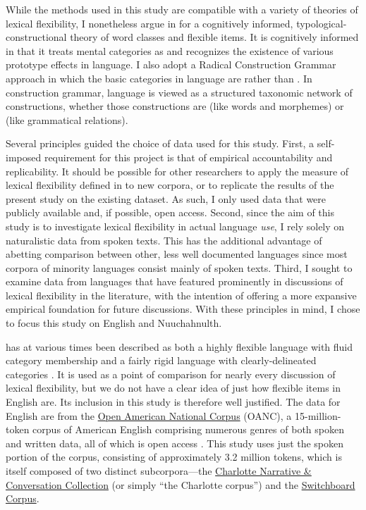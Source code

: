 While the methods used in this study are compatible with a variety of theories of lexical flexibility, I nonetheless argue in  for a cognitively informed, typological-constructional theory of word classes and flexible items. It is cognitively informed in that it treats mental categories as  and recognizes the existence of various prototype effects in language. I also adopt a Radical Construction Grammar approach \parencite{Croft2001b} in which the basic categories in language are  rather than  . In construction grammar, language is viewed as a structured taxonomic network of constructions, whether those constructions are  (like words and morphemes) or  (like grammatical relations).

Several principles guided the choice of data used for this study. First, a self-imposed requirement for this project is that of empirical accountability and replicability. It should be possible for other researchers to apply the measure of lexical flexibility defined in  to new corpora, or to replicate the results of the present study on the existing dataset. As such, I only used data that were publicly available and, if possible, open access. Second, since the aim of this study is to investigate lexical flexibility in actual language \emph{use}, I rely solely on naturalistic data from spoken texts. This has the additional advantage of abetting comparison between other, less well documented languages since most corpora of minority languages consist mainly of spoken texts. Third, I sought to examine data from languages that have featured prominently in discussions of lexical flexibility in the literature, with the intention of offering a more expansive empirical foundation for future discussions. With these principles in mind, I chose to focus this study on English and Nuuchahnulth.

 has at various times been described as both a highly flexible language with fluid category membership \parencites[47--48]{Crystal1967}{Vonen1994}[75--76]{Croft2000}[69]{Croft2001b}{Farrell2001}{Cannon1985} and a fairly rigid language with clearly-delineated categories \parencites[710]{Rijkhoff2007}[4, 11, 12]{SchachterShopen2007}[122, 126]{Velupillai2012}. It is used as a point of comparison for nearly every discussion of lexical flexibility, but we do not have a clear idea of just how flexible items in English are. Its inclusion in this study is therefore well justified. The data for English are from the \href{http://www.anc.org/}{Open American National Corpus} (OANC), a 15-million-token corpus of American English comprising numerous genres of both spoken and written data, all of which is open access \parencite{OANC}. This study uses just the spoken portion of the corpus, consisting of approximately 3.2 million tokens, which is itself composed of two distinct subcorpora—the \href{https://newsouthvoices.uncc.edu}{Charlotte Narrative \& Conversation Collection} (or simply \enquote{the Charlotte corpus}) and the \href{https://catalog.ldc.upenn.edu/LDC97S62}{Switchboard Corpus}.

